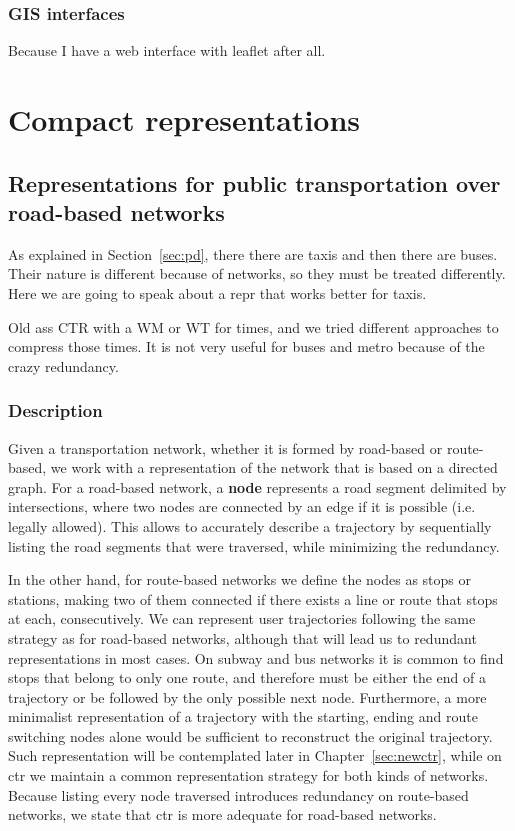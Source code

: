 \documentclass[a4paper,10pt,twoside]{book}
\begin{document}
	\section{GIS interfaces}
	Because I have a web interface with leaflet after all.
	
	
\part{Compact representations}
	\chapter{Representations for public transportation over road-based networks}
	As explained in Section~\ref{sec:pd}, there there are taxis and then there are buses. Their nature is different because of networks, so they must be treated differently. Here we are going to speak about a repr that works better for taxis.
	
	Old ass CTR \cite{brisaboa2018compact} with a WM or WT for times, and we tried different approaches to compress those times. It is not very useful for buses and metro because of the crazy redundancy.
	
	\section{Description}
	Given a transportation network, whether it is formed by road-based or route-based, we work with a representation of the network that is based on a directed graph. For a road-based network, a \textbf{node} represents a road segment delimited by intersections, where two nodes are connected by an edge if it is possible (i.e. legally allowed). This allows to accurately describe a trajectory by sequentially listing the road segments that were traversed, while minimizing the redundancy.
	
	In the other hand, for route-based networks we define the nodes as stops or stations, making two of them connected if there exists a line or route that stops at each, consecutively. We can represent user trajectories following the same strategy as for road-based networks, although that will lead us to redundant representations in most cases. On subway and bus networks it is common to find stops that belong to only one route, and therefore must be either the end of a trajectory or be followed by the only possible next node. Furthermore, a more minimalist representation of a trajectory with the starting, ending and route switching nodes alone would be sufficient to reconstruct the original trajectory. Such representation will be contemplated later in Chapter~\ref{sec:newctr}, while on \gls{ctr} we maintain a common representation strategy for both kinds of networks. Because listing every node traversed introduces redundancy on route-based networks, we state that \gls{ctr} is more adequate for road-based networks.
	
\end{document}
